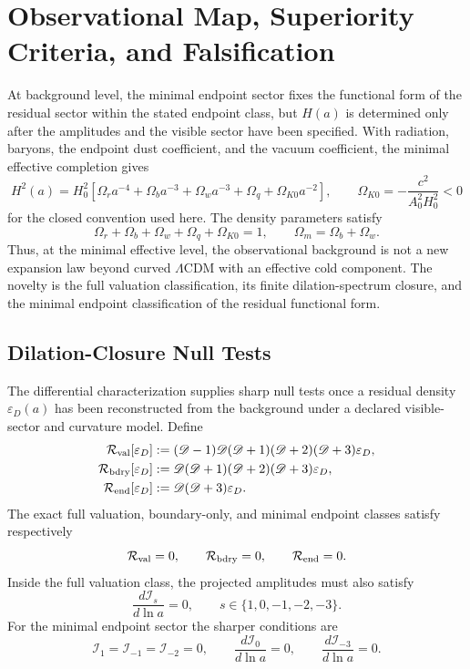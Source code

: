 \documentclass[11pt,a4paper]{article}
\def\dd{d}%
\numberwithin{equation}{section}
\theoremstyle{remark}
\newcommand{\Dil}{\mathscr{D}}
\newcommand{\epsD}{\varepsilon_D}
\newcommand{\dd}{\mathrm{d}}
\begin{document}
\section{Observational Map, Superiority Criteria, and Falsification}
At background level, the minimal endpoint sector fixes the functional form of the residual sector within the stated endpoint class, but \(H(a)\) is determined only after the amplitudes and the visible sector have been specified. With radiation, baryons, the endpoint dust coefficient, and the vacuum coefficient, the minimal effective completion gives
\begin{equation}
H^2(a)=H_0^2\left[
\Omega_r a^{-4}
+\Omega_b a^{-3}
+\Omega_w a^{-3}
+\Omega_q
+\Omega_{K0} a^{-2}
\right],
\qquad
\Omega_{K0}=-\frac{c^2}{A_0^2H_0^2}<0
\end{equation}
for the closed convention used here. The density parameters satisfy
\begin{equation}
\Omega_r+\Omega_b+\Omega_w+\Omega_q+\Omega_{K0}=1,
\qquad
\Omega_m=\Omega_b+\Omega_w.
\end{equation}
Thus, at the minimal effective level, the observational background is not a new expansion law beyond curved \(\Lambda\)CDM with an effective cold component. The novelty is the full valuation classification, its finite dilation-spectrum closure, and the minimal endpoint classification of the residual functional form.

\subsection{Dilation-Closure Null Tests}
The differential characterization supplies sharp null tests once a residual density \(\epsD(a)\) has been reconstructed from the background under a declared visible-sector and curvature model. Define
\begin{align}
\mathcal R_{\rm val}[\epsD]
&:=(\Dil-1)\Dil(\Dil+1)(\Dil+2)(\Dil+3)\epsD,
\\
\mathcal R_{\rm bdry}[\epsD]
&:=\Dil(\Dil+1)(\Dil+2)(\Dil+3)\epsD,
\\
\mathcal R_{\rm end}[\epsD]
&:=\Dil(\Dil+3)\epsD.
\end{align}
The exact full valuation, boundary-only, and minimal endpoint classes satisfy respectively
\begin{equation}
\mathcal R_{\rm val}=0,
\qquad
\mathcal R_{\rm bdry}=0,
\qquad
\mathcal R_{\rm end}=0.
\end{equation}
Inside the full valuation class, the projected amplitudes must also satisfy
\begin{equation}
\frac{\dd\mathcal I_s}{\dd\ln a}=0,
\qquad
s\in\{1,0,-1,-2,-3\}.
\end{equation}
For the minimal endpoint sector the sharper conditions are
\begin{equation}
\mathcal I_1=\mathcal I_{-1}=\mathcal I_{-2}=0,
\qquad
\frac{\dd\mathcal I_0}{\dd\ln a}=0,
\qquad
\frac{\dd\mathcal I_{-3}}{\dd\ln a}=0.
\end{equation}
\end{document}

